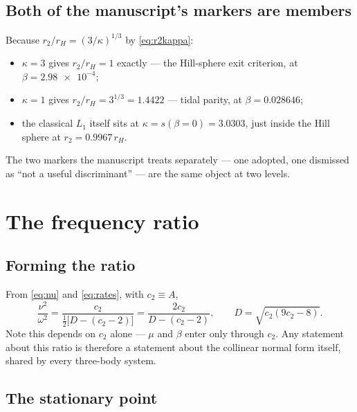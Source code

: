 \documentclass[11pt,a4paper]{article}
\begin{document}
\subsection{Both of the manuscript's markers are members}

Because $r_2/r_H=(3/\kappa)^{1/3}$ by \eqref{eq:r2kappa}:
\begin{itemize}
\item $\kappa=3$ gives $r_2/r_H=1$ exactly --- the Hill-sphere exit criterion,
      at $\beta=\num{2.98e-4}$;
\item $\kappa=1$ gives $r_2/r_H=3^{1/3}=1.4422$ --- tidal parity, at
      $\beta=\num{0.028646}$;
\item the classical $L_1$ itself sits at $\kappa=s(\beta{=}0)=3.0303$, just
      inside the Hill sphere at $r_2=0.9967\,r_H$.
\end{itemize}
The two markers the manuscript treats separately --- one adopted, one dismissed
as ``not a useful discriminant'' --- are the same object at two levels.

\section{The frequency ratio}\label{sec:freq}

\subsection{Forming the ratio}

From \eqref{eq:nu} and \eqref{eq:rates}, with $c_2\equiv A$,
\begin{equation}
  \frac{\nu^2}{\omega^2}
  = \frac{c_2}{\tfrac12\bigl[D-(c_2-2)\bigr]}
  = \frac{2c_2}{D-(c_2-2)},
  \qquad D=\sqrt{c_2(9c_2-8)} .
  \label{eq:R}
\end{equation}
Note this depends on $c_2$ alone --- $\mu$ and $\beta$ enter only through
$c_2$. Any statement about this ratio is therefore a statement about the
collinear normal form itself, shared by every three-body system.

\subsection{The stationary point}
\end{document}
